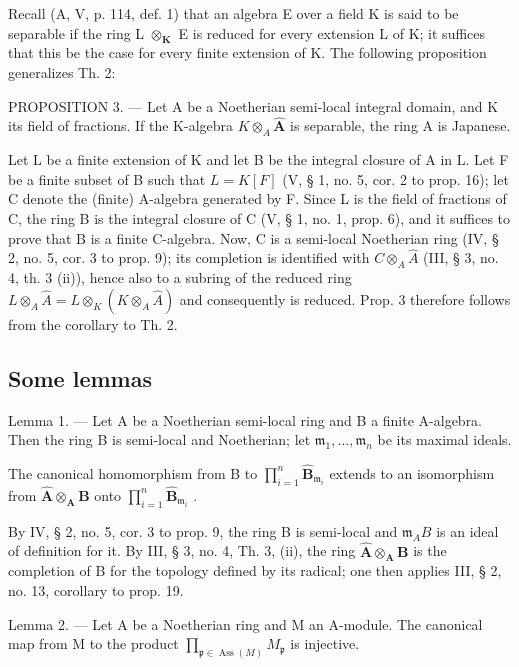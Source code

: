 Recall (A, V, p. 114, def. 1) that an algebra E over a field K is said to be separable if the ring L \(\otimes_{\mathbf{K}}\) E is reduced for every extension L of K; it suffices that this be the case for every finite extension of K. The following proposition generalizes Th. 2:

PROPOSITION 3. --- Let A be a Noetherian semi-local integral domain, and K its field of fractions. If the K-algebra \(K \otimes_{A} \hat{\mathbf{A}}\) is separable, the ring A is Japanese.

Let L be a finite extension of K and let B be the integral closure of A in L. Let F be a finite subset of B such that \(L = K[F]\) (V, § 1, no. 5, cor. 2 to prop. 16); let C denote the (finite) A-algebra generated by F. Since L is the field of fractions of C, the ring B is the integral closure of C (V, § 1, no. 1, prop. 6), and it suffices to prove that B is a finite C-algebra. Now, C is a semi-local Noetherian ring (IV, § 2, no. 5, cor. 3 to prop. 9); its completion is identified with \(C \otimes_{A} \hat{A}\) (III, § 3, no. 4, th. 3 (ii)), hence also to a subring of the reduced ring \(L \otimes_{A} \hat{A} = L \otimes_{K} (K \otimes_{A} \hat{A})\) and consequently is reduced. Prop. 3 therefore follows from the corollary to Th. 2.

\subsection{Some lemmas}

Lemma 1. --- Let A be a Noetherian semi-local ring and B a finite A-algebra. Then the ring B is semi-local and Noetherian; let \(\mathfrak{m}_1, \ldots, \mathfrak{m}_n\) be its maximal ideals.

The canonical homomorphism from B to \(\prod_{i=1}^{n} \hat{\mathbf{B}}_{\mathfrak{m}_i}\) extends to an isomorphism from \(\hat{\mathbf{A}} \otimes_{\mathbf{A}} \mathbf{B}\) onto \(\prod_{i=1}^{n} \hat{\mathbf{B}}_{\mathfrak{m}_i}\) .

By IV, § 2, no. 5, cor. 3 to prop. 9, the ring B is semi-local and \(\mathfrak{m}_{A}B\) is an ideal of definition for it. By III, § 3, no. 4, Th. 3, (ii), the ring \(\hat{\mathbf{A}} \otimes_{\mathbf{A}} \mathbf{B}\) is the completion of B for the topology defined by its radical; one then applies III, § 2, no. 13, corollary to prop. 19.

Lemma 2. — Let A be a Noetherian ring and M an A-module. The canonical map from M to the product \(\prod_{\mathfrak{p} \in \operatorname{Ass}(M)} M_{\mathfrak{p}}\) is injective.


